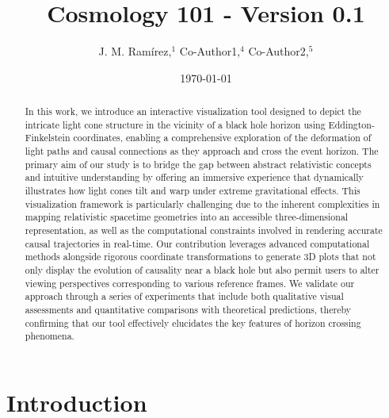 \documentclass{article}
\title{Cosmology 101 - Version 0.1}
\author{J. M. Ram{\'i}rez,$^{1}$ Co-Author1,$^{4}$ Co-Author2,$^{5}$}
\date{\today}
\begin{document}
\maketitle\begin{abstract}
In this work, we introduce an interactive visualization tool designed to depict the intricate light cone structure in the vicinity of a black hole horizon using Eddington-Finkelstein coordinates, enabling a comprehensive exploration of the deformation of light paths and causal connections as they approach and cross the event horizon. The primary aim of our study is to bridge the gap between abstract relativistic concepts and intuitive understanding by offering an immersive experience that dynamically illustrates how light cones tilt and warp under extreme gravitational effects. This visualization framework is particularly challenging due to the inherent complexities in mapping relativistic spacetime geometries into an accessible three-dimensional representation, as well as the computational constraints involved in rendering accurate causal trajectories in real-time. Our contribution leverages advanced computational methods alongside rigorous coordinate transformations to generate 3D plots that not only display the evolution of causality near a black hole but also permit users to alter viewing perspectives corresponding to various reference frames. We validate our approach through a series of experiments that include both qualitative visual assessments and quantitative comparisons with theoretical predictions, thereby confirming that our tool effectively elucidates the key features of horizon crossing phenomena.
\end{abstract}\section{Introduction}
\end{document}
